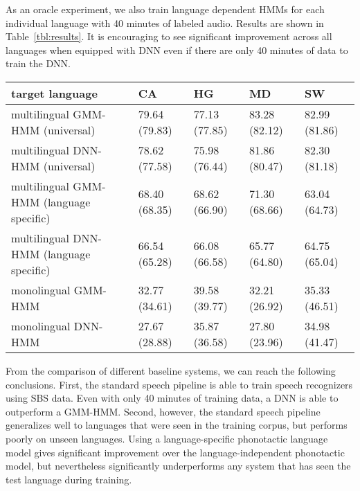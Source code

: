 As an oracle experiment, we also train language dependent HMMs
for each individual language with 40 minutes of labeled audio.
Results are shown in Table~\ref{tbl:results}.  It is encouraging to see
significant improvement across all languages
when equipped with DNN even if there are only 40 minutes of
data to train the DNN.

\begin{table*}
\begin{center}
\begin{tabular}{|l|llll|}
\hline
target language & CA & HG & MD & SW \\
\hline
multilingual GMM-HMM (universal) & 79.64 (79.83) & 77.13 (77.85) & 83.28 (82.12) & 82.99 (81.86) \\
multilingual DNN-HMM (universal) & 78.62 (77.58) & 75.98 (76.44) & 81.86 (80.47) & 82.30 (81.18) \\
multilingual GMM-HMM (language specific) & 68.40 (68.35) & 68.62 (66.90) & 71.30 (68.66) & 63.04 (64.73) \\
multilingual DNN-HMM (language specific) & 66.54 (65.28) & 66.08 (66.58) & 65.77 (64.80) & 64.75 (65.04) \\
\hline
monolingual GMM-HMM & 32.77 (34.61) & 39.58 (39.77) & 32.21 (26.92) & 35.33 (46.51) \\
monolingual DNN-HMM & 27.67 (28.88) & 35.87 (36.58) & 27.80 (23.96) & 34.98 (41.47) \\
\hline
\end{tabular}
\caption{\label{tbl:results} PERs of unadapted
multilingual systems on the evaluation sets along with monolingual systems.
PERs on the development sets are in parentheses.}
\end{center}
\end{table*}

From the comparison of different baseline systems, we can reach the
following conclusions.  First, the standard speech pipeline is able to
train speech recognizers using SBS data.  Even with only 40 minutes of
training data, a DNN is able to outperform a GMM-HMM.  Second,
however, the standard speech pipeline generalizes well to languages
that were seen in the training corpus, but performs poorly on unseen
languages.  Using a language-specific phonotactic language model gives
significant improvement over the language-independent phonotactic
model, but nevertheless significantly underperforms any system that
has seen the test language during training.  

